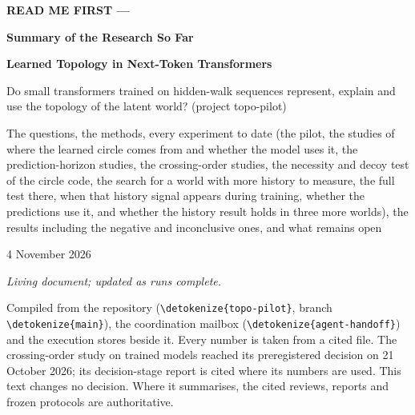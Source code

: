 \documentclass[11pt,a4paper]{article}
\DeclareRobustCommand{\_}{\ifmmode\origunderscore\else\textunderscore\allowbreak\fi}
\DeclareRobustCommand{\fpath}[1]{\begingroup\small\expandafter\nolinkurl\expandafter{\detokenize{#1}}\endgroup}
\begin{document}
\begin{titlepage}
\thispagestyle{empty}
\setlength{\parindent}{0pt}
\vspace*{3.2cm}
{\fontsize{30}{36}\selectfont\bfseries READ ME FIRST ---\par}
\vspace{0.3em}
{\fontsize{26}{32}\selectfont\bfseries Summary of the Research So Far\par}
\vspace{1.0cm}
{\Large \textbf{Learned Topology in Next-Token Transformers}\par}
\vspace{0.3em}
{\large Do small transformers trained on hidden-walk sequences represent, explain and use the
topology of the latent world? (project topo-pilot)\par}
\vspace{0.6cm}
{\large\color{ink2} The questions, the methods, every experiment to date (the pilot, the
studies of where the learned circle comes from and whether the model uses it, the
prediction-horizon studies, the crossing-order studies, the necessity and decoy test of the
circle code, the search for a world with more history to measure, the full test there, when
that history signal appears during training, whether the predictions use it, and whether the
history result holds in three more worlds), the results including
the negative and inconclusive ones, and what remains open\par}
\vspace{1.2cm}
{\large 4 November 2026\par}
\vspace{0.3cm}
{\large\itshape Living document; updated as runs complete.\par}
\vfill
{\small\color{ink2}
Compiled from the repository (\fpath{topo-pilot}, branch \fpath{main}), the coordination
mailbox (\fpath{agent-handoff}) and the execution stores beside it. Every number is taken from
a cited file. The crossing-order study on trained models reached its preregistered decision on
21 October 2026; its decision-stage report is cited where its numbers are used.
This text changes no decision. Where it summarises, the cited reviews, reports and frozen
protocols are authoritative.\par}
\end{titlepage}
\end{document}

